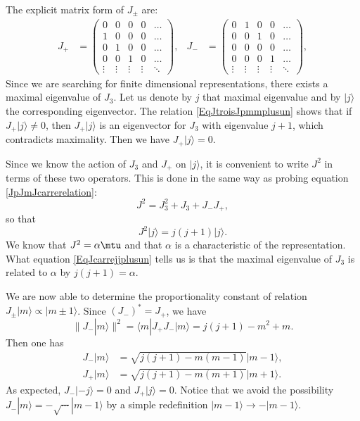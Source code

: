 The explicit matrix form of $J_{\pm}$ are:
\begin{align}
J_{+}&=
\begin{pmatrix}
0	&	0	&	0	&0	&\hdots\\
1	&	0	&	0	&0	&\hdots\\
0	&	1	&	0	&0	&\hdots\\
0	&	0	&	1	&0	&\hdots\\
\vdots	&	\vdots	&	\vdots	&\vdots	&\ddots
\end{pmatrix},
&J_{-}&=
\begin{pmatrix}
0	&	1	&	0	&0	&\hdots\\
0	&	0	&	1	&0	&\hdots\\
0	&	0	&	0	&0	&\hdots\\
0	&	0	&	0	&1	&\hdots\\
\vdots	&	\vdots	&	\vdots	&\vdots	&\ddots
\end{pmatrix},
\end{align}
Since we are searching for finite dimensional representations, there exists a maximal eigenvalue of $J_3$. Let us denote by $j$ that maximal eigenvalue and by $| j \rangle$ the corresponding eigenvector. The relation \eqref{EqJtroisJpmmplusun} shows that if $J_+| j \rangle\neq 0$, then $J_+| j \rangle$ is an eigenvector for $J_3$ with eigenvalue $j+1$, which contradicts maximality. Then we have $J_+| j \rangle=0$.

Since we know the action of $J_3$ and $J_+$ on $| j \rangle$, it is convenient to write $J^2$ in terms of these two operators. This is done in the same way as probing equation \eqref{JpJmJcarrerelation}:
\begin{equation}
	J^2=J_3^2+J_3+J_-J_+,
\end{equation}
so that
\begin{equation}		\label{EqJcarrejjplusun}
	J^2| j \rangle=j(j+1)| j \rangle.
\end{equation}
We know that $J^2=\alpha\mtu$ and that $\alpha$ is a characteristic of the representation. What equation \eqref{EqJcarrejjplusun} tells us is that the maximal eigenvalue of $J_3$ is related to $\alpha$ by $j(j+1)=\alpha$.

We are now able to determine the proportionality constant of relation $J_{\pm}| m \rangle\propto| m\pm 1 \rangle$. Since $(J_-)^*=J_+$, we have
\begin{equation}	\label{EqnormeJmoinm}
	\| J_-| m \rangle \|^2=\langle m| J_+J_- | m \rangle = j(j+1)-m^2+m.
\end{equation}
Then one has
\begin{subequations}	
	\begin{align}
		J_-| m \rangle	&=\sqrt{j(j+1)-m(m-1)}| m-1 \rangle,	\label{EqJmoinsmanglemmointun}		\\
		J_+| m \rangle	&=\sqrt{j(j+1)-m(m+1)}| m+1 \rangle.
	\end{align}
\end{subequations}
As expected, $J_-| -j \rangle=0$ and $J_+| j \rangle=0$. Notice that we avoid the possibility $J_-| m \rangle=-\sqrt{\cdots}| m-1 \rangle$ by a simple redefinition $| m-1 \rangle\to -| m-1 \rangle$.

